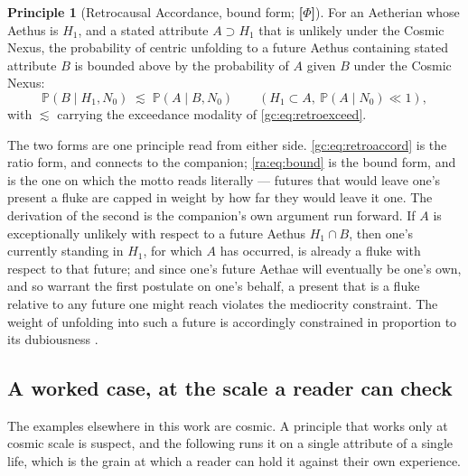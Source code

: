 \documentclass[11pt]{article}
\numberwithin{equation}{section}
\theoremstyle{plain}
\theoremstyle{definition}
\newtheorem{principle}{Principle}
\theoremstyle{remark}
\newcommand{\PP}{\mathbb{P}}
\begin{document}
\begin{principle}[Retrocausal Accordance, bound form; \textbf{[$\Phi$]}]
\label{ra:prin:bound}
For an Aetherian whose Aethus is $H_1$, and a stated attribute
$A\supset H_1$ that is unlikely under the Cosmic Nexus, the probability
of centric unfolding to a future Aethus containing stated attribute $B$
is bounded above by the probability of $A$ given $B$ under the Cosmic
Nexus:
\begin{equation}\label{ra:eq:bound}
\PP(B\mid H_1,N_0)\;\lesssim\;\PP(A\mid B,N_0)
\qquad(H_1\subset A,\ \PP(A\mid N_0)\ll1),
\end{equation}
with $\lesssim$ carrying the exceedance modality of
\eqref{gc:eq:retroexceed}.
\end{principle}

The two forms are one principle read from either side.
\eqref{gc:eq:retroaccord} is the ratio form, and connects to the
companion; \eqref{ra:eq:bound} is the bound form, and is the one on which
the motto reads literally --- futures that would leave one's present a
fluke are capped in weight by how far they would leave it one. The
derivation of the second is the companion's own argument run forward.
If $A$ is exceptionally unlikely with respect to a future Aethus
$H_1\cap B$, then one's currently standing in $H_1$, for which $A$
has occurred, is already a fluke with respect to that future; and
since one's future Aethae will eventually be one's own, and so warrant
the first postulate on one's behalf, a present that is a fluke relative
to any future one might reach violates the mediocrity constraint. The
weight of unfolding into such a future is accordingly constrained in
proportion to its dubiousness \cite{Nexus}.

\subsection{A worked case, at the scale a reader can check}
\label{ra:sub:example}

The examples elsewhere in this work are cosmic. A principle that works
only at cosmic scale is suspect, and the following runs it on a single
attribute of a single life, which is the grain at which a reader can hold
it against their own experience.
\end{document}
